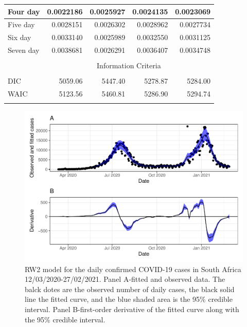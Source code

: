 \documentclass[10pt,letterpaper]{article}
\begin{document}
\begin{table}[!h]
\begin{tabular}[t]{lrrrr}
		\hline
		Four day & 0.0022186 & 0.0025927 & 0.0024135 & 0.0023069\\
		\hline
		Five day & 0.0028151 & 0.0026302 & 0.0028962 & 0.0027734\\
		\hline
		Six day & 0.0033140 & 0.0025989 & 0.0032550 & 0.0031125\\
		\hline
		Seven day & 0.0038681 & 0.0026291 & 0.0036407 & 0.0034748\\
		\hline\\
		& \multicolumn{4}{c}{Information Criteria}\\
		\hline\\
		DIC & 5059.06 & 5447.40 & 5278.87 & 5284.00\\
		WAIC & 5123.56 & 5460.81 & 5286.90 & 5294.74\\
		\hline\\
	\end{tabular}
\end{table}

\begin{figure}[H]
	\includegraphics[width=0.95\linewidth]{COVIDincidenceSA_files/figure-latex/unnamed-chunk-7-1} \caption{RW2 model for the daily confirmed COVID-19 cases in South Africa 12/03/2020-27/02/2021.  Panel A-fitted and observed data. The balck dotes are the observed number of daily cases, the black solid line the fitted curve, and the blue shaded area is the 95\% credible interval. Panel B-first-order derivative of the fitted curve along with the 95\% credible interval.}\label{fig:unnamed-chunk-7}
\end{figure}
\end{document}
